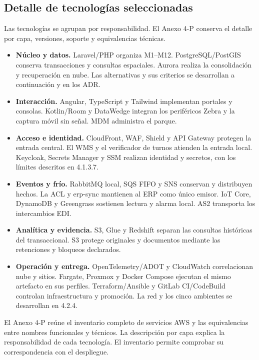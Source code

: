 \subsection{Detalle de tecnologías seleccionadas}

Las tecnologías se agrupan por responsabilidad. El Anexo 4-P conserva el detalle por capa, versiones, soporte y equivalencias técnicas.

\begin{itemize}
\item \textbf{Núcleo y datos.} Laravel/PHP organiza M1–M12. PostgreSQL/PostGIS conserva transacciones y consultas espaciales. Aurora realiza la consolidación y recuperación en nube. Las alternativas y sus criterios se desarrollan a continuación y en los ADR.

\item \textbf{Interacción.} Angular, TypeScript y Tailwind implementan portales y consolas. Kotlin/Room y DataWedge integran los periféricos Zebra y la captura móvil sin señal. MDM administra el parque.

\item \textbf{Acceso e identidad.} CloudFront, WAF, Shield y API Gateway protegen la entrada central. El WMS y el verificador de turnos atienden la entrada local. Keycloak, Secrets Manager y SSM realizan identidad y secretos, con los límites descritos en 4.1.3.7.

\item \textbf{Eventos y frío.} RabbitMQ local, SQS FIFO y SNS conservan y distribuyen hechos. La ACL y erp-sync mantienen al ERP como único emisor. IoT Core, DynamoDB y Greengrass sostienen lectura y alarma local. AS2 transporta los intercambios EDI.

\item \textbf{Analítica y evidencia.} S3, Glue y Redshift separan las consultas históricas del transaccional. S3 protege originales y documentos mediante las retenciones y bloqueos declarados.

\item \textbf{Operación y entrega.} OpenTelemetry/ADOT y CloudWatch correlacionan nube y sitios. Fargate, Proxmox y Docker Compose ejecutan el mismo artefacto en sus perfiles. Terraform/Ansible y GitLab CI/CodeBuild controlan infraestructura y promoción. La red y los cinco ambientes se desarrollan en 4.2.4.

\end{itemize}
El Anexo 4-P reúne el inventario completo de servicios AWS y las equivalencias entre nombres funcionales y técnicos. La descripción por capa explica la responsabilidad de cada tecnología. El inventario permite comprobar su correspondencia con el despliegue.

